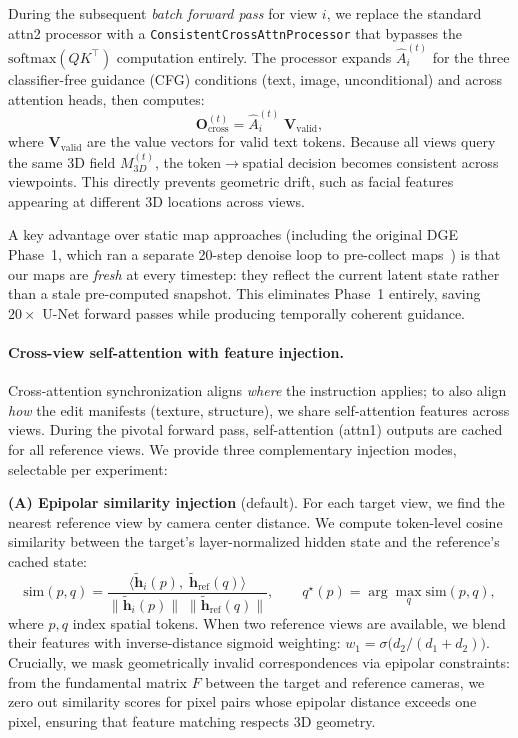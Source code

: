 During the subsequent \emph{batch forward pass} for view $i$, we replace the standard attn2 processor with a \texttt{ConsistentCrossAttnProcessor} that bypasses the $\mathrm{softmax}(QK^\top)$ computation entirely.
The processor expands $\hat{A}_i^{(t)}$ for the three classifier-free guidance (CFG) conditions (text, image, unconditional) and across attention heads, then computes:
\begin{equation}
\mathbf{O}_{\mathrm{cross}}^{(t)} = \hat{A}_i^{(t)} \; \mathbf{V}_{\mathrm{valid}},
\label{eq:cross_replace}
\end{equation}
where $\mathbf{V}_{\mathrm{valid}}$ are the value vectors for valid text tokens.
Because all views query the same 3D field $M_{3D}^{(t)}$, the token$\to$spatial decision becomes consistent across viewpoints.
This directly prevents geometric drift, such as facial features appearing at different 3D locations across views.

A key advantage over static map approaches (including the original DGE Phase~1, which ran a separate 20-step denoise loop to pre-collect maps~\cite{chen_gaussianeditor_2024}) is that our maps are \emph{fresh} at every timestep: they reflect the current latent state rather than a stale pre-computed snapshot.
This eliminates Phase~1 entirely, saving $20 \times$ U-Net forward passes while producing temporally coherent guidance.

\paragraph{Cross-view self-attention with feature injection.}
Cross-attention synchronization aligns \emph{where} the instruction applies; to also align \emph{how} the edit manifests (texture, structure), we share self-attention features across views.
During the pivotal forward pass, self-attention (attn1) outputs are cached for all reference views.
We provide three complementary injection modes, selectable per experiment:

\textbf{(A) Epipolar similarity injection} (default).
For each target view, we find the nearest reference view by camera center distance.
We compute token-level cosine similarity between the target's layer-normalized hidden state and the reference's cached state:
\begin{equation}
\mathrm{sim}(p,q)=
\frac{\langle \tilde{\mathbf{h}}_{i}(p),\; \tilde{\mathbf{h}}_{\mathrm{ref}}(q)\rangle}
{\|\tilde{\mathbf{h}}_{i}(p)\|\;\|\tilde{\mathbf{h}}_{\mathrm{ref}}(q)\|},
\qquad
q^{\star}(p)=\arg\max_q \mathrm{sim}(p,q),
\label{eq:sim_nn}
\end{equation}
where $p,q$ index spatial tokens.
When two reference views are available, we blend their features with inverse-distance sigmoid weighting: $w_1 = \sigma\!\bigl(d_2/(d_1{+}d_2)\bigr)$.
Crucially, we mask geometrically invalid correspondences via epipolar constraints: from the fundamental matrix $F$ between the target and reference cameras, we zero out similarity scores for pixel pairs whose epipolar distance exceeds one pixel, ensuring that feature matching respects 3D geometry.

